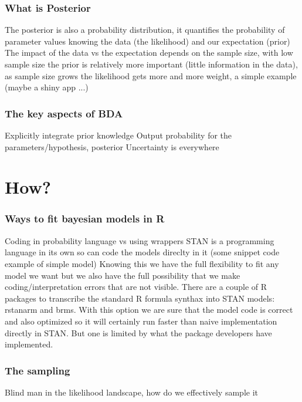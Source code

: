 \documentclass{beamer}
\begin{document}
  \begin{frame}
  \frametitle{\bf What is Posterior}
  
  The posterior is also a probability distribution, it quantifies the probability of parameter values knowing the data (the likelihood) and our expectation (prior)
  The impact of the data vs the expectation depends on the sample size, with low sample size the prior is relatively more important (little information in the data), as
  sample size grows the likelihood gets more and more weight, a simple example (maybe a shiny app ...)
  
 
 
\begin{frame}
 \frametitle{\bf The key aspects of BDA}
 
 Explicitly integrate prior knowledge 
 Output probability for the parameters/hypothesis, posterior
 Uncertainty is everywhere
 
\end{frame}

\section{How?}

 \begin{frame}
  \frametitle{\bf Ways to fit bayesian models in R}
  
  Coding in probability language vs using wrappers
  STAN is a programming language in its own so can code the models direclty in it (some snippet code example of simple model)
  Knowing this we have the full flexibility to fit any model we want but we also have the full possibility that we make coding/interpretation
  errors that are not visible.
  There are a couple of R packages to transcribe the standard R formula synthax into STAN models: rstanarm and brms. With this option we are sure that the model
  code is correct and also optimized so it will certainly run faster than naive implementation directly in STAN. But one is limited by what the package developers have
  implemented. 
  
 \end{frame}

  \begin{frame}
  \frametitle{\bf The sampling}
  
  Blind man in the likelihood landscape, how do we effectively sample it
  

\end{frame}
\end{frame}
\end{document}
